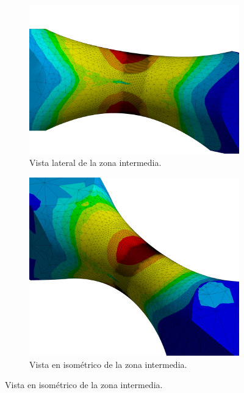 \begin{figure}[h]
\centering
	\begin{subfigure}{0.8\linewidth}
		\centering
		\includegraphics[width=\linewidth]{Imagenes/r_lat.png}
		\caption{Vista lateral de la zona intermedia.}
		\label{fig:r_lat}
	\end{subfigure}
	\begin{subfigure}{0.8\linewidth}
		\centering
		\includegraphics[width=\linewidth]{Imagenes/r_iso.png}
		\caption{Vista en isométrico de la zona intermedia.}
		\label{fig:r_iso}
	\end{subfigure}
\end{figure}
